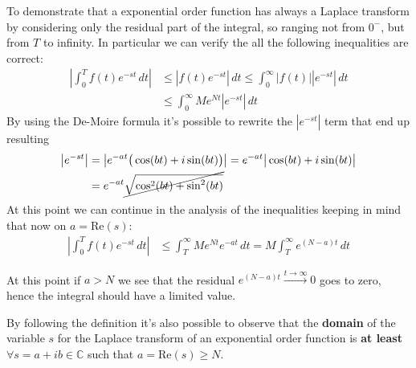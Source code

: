 	\begin{demonstration}
		To demonstrate that a exponential order function has always a Laplace transform by considering only the residual part of the integral, so ranging not from $0^-$, but from $T$ to infinity. In particular we can verify the all the following inequalities are correct:
		\begin{align*}
			\left| \int_0^T f(t) e^{-st} \, dt \right| & \leq \left| f(t) e^{-st} \right| \, dt 
			 \leq \int_0^\infty |f(t)| \left|e^{-st}\right| \, dt \\ 
			& \leq \int_0^\infty M e^{Nt} \left|e^{-st}\right| \, dt
		\end{align*}
		By using the De-Moire formula it's possible to rewrite the $|e^{-st}|$ term that end up resulting
		\begin{align*}
			\left|e^{-st}\right| & = \left| e^{-at} \big(\cos(bt) + i \sin(bt)\big) \right| = e^{-at} \big|\cos(bt) + i\sin(bt)\big| \\
			& = e^{-at} \cancel{\sqrt{\cos^2(bt)  + \sin^2(bt)}}
		\end{align*}
		At this point we can continue in the analysis of the inequalities keeping in mind that now on $a = \textrm{Re}(s)$:
		\begin{align*}
			\left| \int_0^T f(t) e^{-st} \, dt \right| & \leq \int_T^\infty Me^{Nt} e^{-at} \, dt = M \int_T^\infty e^{(N-a)t} \, dt
		\end{align*}
		
		At this point if $a>N$ we see that the residual $e^{(N-a)t} \xrightarrow{t\rightarrow \infty}0$ goes to zero, hence the integral should have a limited value.	
	\end{demonstration}
	By following the definition it's also possible to observe that the \textbf{domain} of the variable $s$ for the Laplace transform of an exponential order function is \textbf{at least} $\forall s = a + ib \in \mathds C$ such that $a = \textrm{Re}(s) \geq N$.

